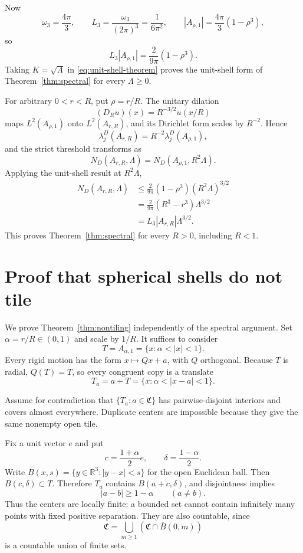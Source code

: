 \documentclass[11pt]{article}
\numberwithin{equation}{section}
\theoremstyle{definition}
\theoremstyle{remark}
\newcommand{\R}{\mathbb R}
\begin{document}
Now
\[
  \omega_3=\frac{4\pi}{3},
  \qquad
  L_3=\frac{\omega_3}{(2\pi)^3}=\frac1{6\pi^2},
  \qquad
  |A_{\rho,1}|=\frac{4\pi}{3}(1-\rho^3),
\]
so
\begin{equation}
  L_3|A_{\rho,1}|=\frac{2}{9\pi}(1-\rho^3).
  \label{eq:weyl-normalization}
\end{equation}
Taking \(K=\sqrt\Lambda\) in \eqref{eq:unit-shell-theorem} proves the
unit-shell form of Theorem~\ref{thm:spectral} for every \(\Lambda\ge0\).

For arbitrary \(0<r<R\), put \(\rho=r/R\).  The unitary dilation
\[
  (D_Ru)(x)=R^{-3/2}u(x/R)
\]
maps \(L^2(A_{\rho,1})\) onto \(L^2(A_{r,R})\), and its Dirichlet form
scales by \(R^{-2}\).  Hence
\[
  \lambda_j^D(A_{r,R})=R^{-2}\lambda_j^D(A_{\rho,1}),
\]
and the strict threshold transforms as
\begin{equation}
  N_D(A_{r,R},\Lambda)
  =N_D(A_{\rho,1},R^2\Lambda).
  \label{eq:dilation-count}
\end{equation}
Applying the unit-shell result at \(R^2\Lambda\),
\[
\begin{aligned}
  N_D(A_{r,R},\Lambda)
  &\le\frac{2}{9\pi}(1-\rho^3)(R^2\Lambda)^{3/2}\\
  &=\frac{2}{9\pi}(R^3-r^3)\Lambda^{3/2}\\
  &=L_3|A_{r,R}|\Lambda^{3/2}.
\end{aligned}
\]
This proves Theorem~\ref{thm:spectral} for every \(R>0\), including
\(R<1\).

\section{Proof that spherical shells do not tile}

We prove Theorem~\ref{thm:nontiling} independently of the spectral argument.
Set \(\alpha=r/R\in(0,1)\) and scale by \(1/R\).  It suffices to consider
\[
  T=A_{\alpha,1}=\{x:\alpha<|x|<1\}.
\]
Every rigid motion has the form \(x\mapsto Qx+a\), with \(Q\) orthogonal.
Because \(T\) is radial, \(Q(T)=T\), so every congruent copy is a translate
\[
  T_a=a+T=\{x:\alpha<|x-a|<1\}.
\]

Assume for contradiction that \(\{T_a:a\in\mathfrak C\}\) has
pairwise-disjoint interiors and covers almost everywhere.  Duplicate centers
are impossible because they give the same nonempty open tile.

Fix a unit vector \(e\) and put
\[
  c=\frac{1+\alpha}{2}e,
  \qquad
  \delta=\frac{1-\alpha}{2}.
\]
Write \(B(x,s)=\{y\in\R^3:|y-x|<s\}\) for the open Euclidean ball.
Then \(B(c,\delta)\subset T\).  Therefore \(T_a\) contains
\(B(a+c,\delta)\), and disjointness implies
\begin{equation}
  |a-b|\ge1-\alpha
  \qquad(a\ne b).
  \label{eq:center-separation}
\end{equation}
Thus the centers are locally finite: a bounded set cannot contain infinitely
many points with fixed positive separation.  They are also countable, since
\[
  \mathfrak C
  =\bigcup_{m\ge1}(\mathfrak C\cap\overline B(0,m))
\]
is a countable union of finite sets.
\end{document}
